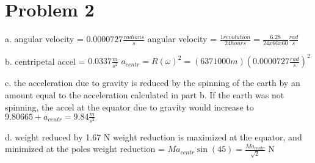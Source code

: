 \chapter{Problem 2}
\label{Problem 2}
a. angular velocity = $0.0000727 \frac{radians}{s}$\newline
angular velocity = $\frac{1 revolution}{24 hours} = \frac{6.28}{24 x 60 x 60}\frac{rad}{s}$\newline

b. centripetal accel = $0.0337 \frac{m}{s^{2}}$ \newline
$a_{centr} = R(\omega)^{2} = (6371000 m)(0.0000727 \frac{rad}{s})^{2}$\newline

c. the acceleration due to gravity is reduced by the spinning of the earth\newline
by an amount equal to the acceleration calculated in part b.  If the earth\newline
was not spinning, the accel at the equator due to gravity would increase to\newline
$9.80665 + a_{centr} = 9.84 \frac{m}{s^2}$\newline

d. weight reduced by 1.67 N\newline
weight reduction is maximized at the equator, and minimized at the poles\newline
weight reduction = $Ma_{centr}\sin(45) = \frac{Ma_{centr}}{\sqrt{2}}$ N

